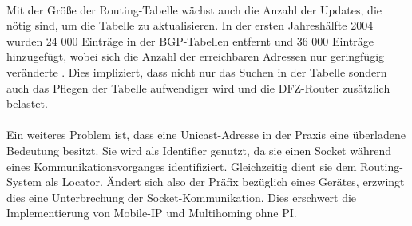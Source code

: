 \paragraph{}
Mit der Größe der Routing-Tabelle wächst auch die Anzahl der Updates, die nötig sind, um die Tabelle zu aktualisieren. In der ersten Jahreshälfte 2004 wurden 24 000 Einträge in der BGP-Tabellen entfernt und 36 000 Einträge hinzugefügt, wobei sich die Anzahl der erreichbaren Adressen nur geringfügig veränderte \cite{journals/ccr/MengXZHLZ04}. Dies impliziert, dass nicht nur das Suchen in der Tabelle sondern auch das Pflegen der Tabelle aufwendiger wird und die DFZ-Router zusätzlich belastet.

\paragraph{} 
Ein weiteres Problem ist, dass eine Unicast-Adresse in der Praxis eine überladene Bedeutung besitzt. Sie wird als Identifier genutzt, da sie einen Socket während eines Kommunikationsvorganges identifiziert. Gleichzeitig dient sie dem Routing-System als Locator. Ändert sich also der Präfix bezüglich eines Gerätes, erzwingt dies eine Unterbrechung der Socket-Kommunikation. Dies erschwert die Implementierung von Mobile-IP und Multihoming ohne PI.


